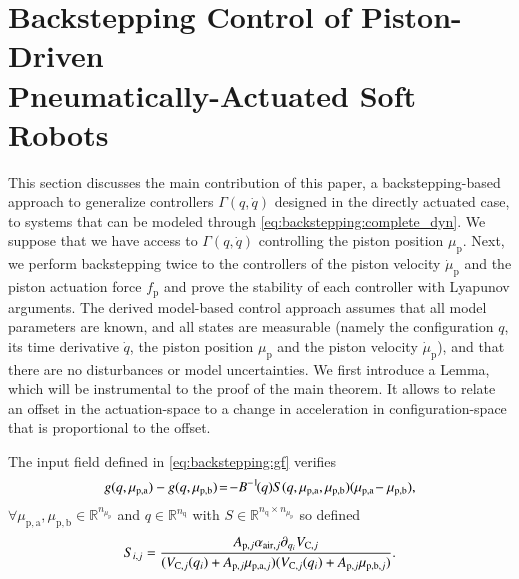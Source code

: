\section{Backstepping Control of Piston-Driven\\ Pneumatically-Actuated Soft Robots}\label{sec:backstepping:backstepping_proof}

This section discusses the main contribution of this paper, a backstepping-based approach to generalize controllers $\Gamma(q,\dot{q})$ designed in the directly actuated case, to systems that can be modeled through \eqref{eq:backstepping:complete_dyn}.
We suppose that we have access to $\Gamma(q, \dot{q})$ controlling the piston position $\mu_\mathrm{p}$. Next, we perform backstepping twice to the controllers of the piston velocity $\dot{\mu}_\mathrm{p}$ and the piston actuation force $f_\mathrm{p}$ and prove the stability of each controller with Lyapunov arguments.
The derived model-based control approach assumes that all model parameters are known, and all states are measurable (namely the configuration $q$, its time derivative $\dot{q}$, the piston position $\mu_\mathrm{p}$ and the piston velocity $\dot{\mu}_\mathrm{p}$), and that there are no disturbances or model uncertainties. 
We first introduce a Lemma, which will be instrumental to the proof of the main theorem. It allows to relate an offset in the actuation-space to a change in acceleration in configuration-space that is proportional to the offset.
%
\begin{Lemma}\label{lemma:f_g_S}%
The input field defined in \eqref{eq:backstepping:gf} verifies
%
\begin{equation*}\small
    g(q,\mu_{\mathrm{p},\mathrm{a}}) - g(q,\mu_{\mathrm{p},\mathrm{b}}) \!=\!  -B^{-1}\!(q)S(q,\mu_{\mathrm{p},\mathrm{a}},\mu_{\mathrm{p},\mathrm{b}})(\mu_{\mathrm{p},\mathrm{a}} \!- \mu_{\mathrm{p},\mathrm{b}}),    
\end{equation*}
%
$\forall \mu_{\mathrm{p},\mathrm{a}},\mu_{\mathrm{p},\mathrm{b}} \in \mathbb{R}^{n_{\mu_\mathrm{p}}}$ and $q \in \mathbb{R}^{n_{\mathrm{q}}}$
	with $S \in \mathbb{R}^{n_{\mathrm{q}} \times n_{\mu_\mathrm{p}}} $ so defined
	\begin{equation*}\small
	    S_{i,j} = \frac{ A_{\mathrm{p},j} \alpha_{\mathrm{air},j} \partial_{q_i}V_{\mathrm{C},j}}{(V_{\mathrm{C},j}(q_i) + A_{\mathrm{p},j} \mu_{\mathrm{p},\mathrm{a},j})(V_{\mathrm{C},j}(q_i) + A_{\mathrm{p},j} \mu_{\mathrm{p},\mathrm{b},j})}.
	\end{equation*}
\end{Lemma}
